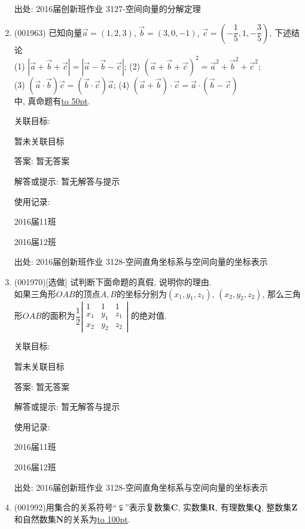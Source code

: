 \documentclass[10pt,a4paper]{article}
\newcommand{\blank}[1]{\underline{\hbox to #1pt{}}}
\begin{document}
\begin{enumerate}[1.]
出处: 2016届创新班作业	3127-空间向量的分解定理
\item { (001963)}%
已知向量$\overrightarrow{a}=(1,2,3)$, $\overrightarrow{b}=(3,0,-1)$, $\overrightarrow{c}=(-\dfrac{1}{5},1,-\dfrac{3}{5})$, 下述结论\\ 
(1) $|\overrightarrow{a}+\overrightarrow{b}+\overrightarrow{c}|=|\overrightarrow{a}-\overrightarrow{b}-\overrightarrow{c}|$; (2) $(\overrightarrow{a}+\overrightarrow{b}+\overrightarrow{c})^2=\overrightarrow{a}^2+\overrightarrow{b}^2+\overrightarrow{c}^2$;\\ 
(3) $(\overrightarrow{a}\cdot\overrightarrow{b})\overrightarrow{c}=(\overrightarrow{b}\cdot \overrightarrow{c})\overrightarrow{a}$; (4) $(\overrightarrow{a}+\overrightarrow{b})\cdot \overrightarrow{c}=\overrightarrow{a}\cdot (\overrightarrow{b}-\overrightarrow{c})$\\ 
中, 真命题有\blank{50}.


关联目标:

暂未关联目标

答案: 暂无答案

解答或提示: 暂无解答与提示

使用记录:

2016届11班	

2016届12班	


出处: 2016届创新班作业	3128-空间直角坐标系与空间向量的坐标表示
\item { (001970)}[选做]
试判断下面命题的真假, 说明你的理由.\\ 
如果三角形$OAB$的顶点$A,B$的坐标分别为$(x_1,y_1,z_1)$, $(x_2,y_2,z_2)$, 那么三角形$OAB$的面积为$\dfrac{1}{2}\left|\begin{array}{ccc}1&1&1\\x_1&y_1&z_1\\x_2&y_2&z_2\end{array}\right|$ 的绝对值.


关联目标:

暂未关联目标

答案: 暂无答案

解答或提示: 暂无解答与提示

使用记录:

2016届11班	

2016届12班	


出处: 2016届创新班作业	3128-空间直角坐标系与空间向量的坐标表示
\item { (001992)}用集合的关系符号``$\subsetneqq$''表示复数集$\mathbf{C}$, 实数集$\mathbf{R}$, 有理数集$\mathbf{Q}$,
整数集$\mathbf{Z}$和自然数集$\mathbf{N}$的关系为\blank{100}.



\end{enumerate}
\end{document}
